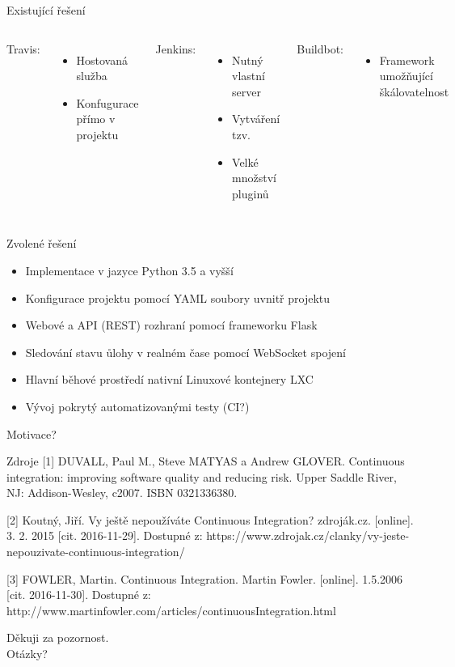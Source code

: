 \documentclass{beamer}
\begin{document}
	\begin{frame}{Existující řešení}
		\begin{columns}[T,onlytextwidth]
				Travis:
				\begin{itemize}
					\item Hostovaná služba
					\item Konfugurace přímo v projektu
				\end{itemize}
				Jenkins:
				\begin{itemize}
					\item Nutný vlastní server
					\item Vytváření tzv. 
					\item Velké množství pluginů
				\end{itemize}
				Buildbot:
				\begin{itemize}
					\item Framework umožňující škálovatelnost
				\end{itemize}
				
				\bigskip

				
		\end{columns}
	\end{frame}

	\begin{frame}{Zvolené řešení}
		\begin{itemize}
			\item Implementace v jazyce Python 3.5 a vyšší
			\item Konfigurace projektu pomocí YAML soubory uvnitř projektu
			\item Webové a API (REST) rozhraní pomocí frameworku Flask
			\item Sledování stavu ůlohy v realném čase pomocí WebSocket spojení
			\item Hlavní běhové prostředí nativní Linuxové kontejnery LXC
			\item Vývoj pokrytý automatizovanými testy (CI?)
		\end{itemize}
	\end{frame}

	\begin{frame}[standout]
		Motivace?	
	\end{frame}

	\begin{frame}{Zdroje}
		[1] DUVALL, Paul M., Steve MATYAS a Andrew GLOVER. Continuous integration: improving software quality and reducing risk. Upper Saddle River, NJ: Addison-Wesley, c2007. ISBN 0321336380.
	
		[2] Koutný, Jiří. Vy ještě nepoužíváte Continuous Integration? zdroják.cz. [online]. 3. 2. 2015 [cit. 2016-11-29]. Dostupné z: https://www.zdrojak.cz/clanky/vy-jeste-nepouzivate-continuous-integration/
	
		[3] FOWLER, Martin. Continuous Integration. Martin Fowler. [online]. 1.5.2006 [cit. 2016-11-30]. Dostupné z: http://www.martinfowler.com/articles/continuousIntegration.html
	\end{frame}

	\begin{frame}[standout]
		Děkuji za pozornost. \\
		\bigskip\bigskip\bigskip
		Otázky?
	\end{frame}
\end{document}

